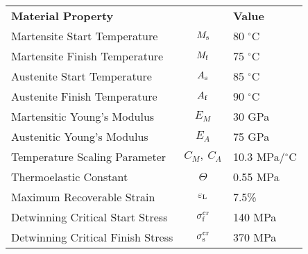 \documentclass[border=1mm,
               class=article
               preview]{standalone}
\begin{document}
\renewcommand{\arraystretch}{1.5}
 {
\begin{tabular}{lcl}
   \rowcolor{black} \textbf{\color{white} Material Property} & & \textbf{\color{white} Value}\\
   Martensite Start Temperature & $M_\mathrm{s}$       & 80 $^\circ$C\\
   Martensite Finish Temperature & $M_\mathrm{f}$       & 75 $^\circ$C\\
   Austenite Start Temperature & $A_\mathrm{s}$       & 85 $^\circ$C\\
   Austenite Finish Temperature & $A_\mathrm{f}$       & 90 $^\circ$C\\
   Martensitic Young's Modulus & $E_M$       & 30 GPa\\
   Austenitic Young's Modulus & $E_A$       & 75 GPa\\
   Temperature Scaling Parameter & $C_M,~C_A$ & 10.3 MPa/$^\circ$C\\
   Thermoelastic Constant & $\Theta$ & 0.55 MPa\\
   Maximum Recoverable Strain & $\varepsilon_\mathrm{L}$ & 7.5\% \\
   Detwinning Critical Start Stress & $\sigma_\mathrm{f}^\mathrm{cr}$ & 140 MPa\\
   Detwinning Critical Finish Stress & $\sigma_\mathrm{s}^\mathrm{cr}$ & 370 MPa\\
\end{tabular}}
\renewcommand{\arraystretch}{1}
\end{document}
